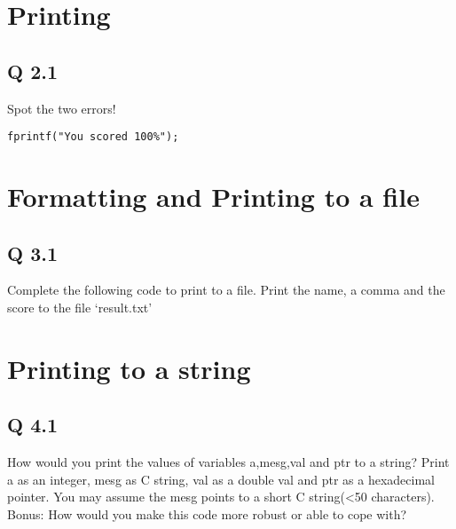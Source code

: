 \section{Printing}\label{printing}

\subsection{Q 2.1}\label{q-2.1}

Spot the two errors!

\begin{verbatim}
fprintf("You scored 100%");
\end{verbatim}

\section{Formatting and Printing to a
file}\label{formatting-and-printing-to-a-file}

\subsection{Q 3.1}\label{q-3.1}

Complete the following code to print to a file. Print the name, a comma
and the score to the file `result.txt'

\begin{Shaded}
\begin{Highlighting}[]
 
\NormalTok{,_____);}
    \NormalTok{_____}
\NormalTok{\}}
\end{Highlighting}
\end{Shaded}

\section{Printing to a string}\label{printing-to-a-string}

\subsection{Q 4.1}\label{q-4.1}

How would you print the values of variables a,mesg,val and ptr to a
string? Print a as an integer, mesg as C string, val as a double val and
ptr as a hexadecimal pointer. You may assume the mesg points to a short
C string(\textless{}50 characters). Bonus: How would you make this code
more robust or able to cope with?

